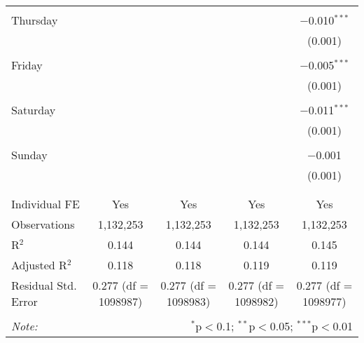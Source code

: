 \documentclass[
]{article}
\begin{document}
\begin{table}[!htbp]
{\begin{tabular}{@{\extracolsep{5pt}}lcccc}
  & & & & \\ 
 Thursday &  &  &  & $-$0.010$^{***}$ \\ 
  &  &  &  & (0.001) \\ 
  & & & & \\ 
 Friday &  &  &  & $-$0.005$^{***}$ \\ 
  &  &  &  & (0.001) \\ 
  & & & & \\ 
 Saturday &  &  &  & $-$0.011$^{***}$ \\ 
  &  &  &  & (0.001) \\ 
  & & & & \\ 
 Sunday &  &  &  & $-$0.001 \\ 
  &  &  &  & (0.001) \\ 
  & & & & \\ 
\hline \\[-1.8ex] 
Individual FE & Yes & Yes & Yes & Yes \\ 
Observations & 1,132,253 & 1,132,253 & 1,132,253 & 1,132,253 \\ 
R$^{2}$ & 0.144 & 0.144 & 0.144 & 0.145 \\ 
Adjusted R$^{2}$ & 0.118 & 0.118 & 0.119 & 0.119 \\ 
Residual Std. Error & 0.277 (df = 1098987) & 0.277 (df = 1098983) & 0.277 (df = 1098982) & 0.277 (df = 1098977) \\ 
\hline 
\hline \\[-1.8ex] 
\textit{Note:}  & \multicolumn{4}{r}{$^{*}$p$<$0.1; $^{**}$p$<$0.05; $^{***}$p$<$0.01} \\ 
\end{tabular}
} 
\end{table} 
\newpage
\end{document}
